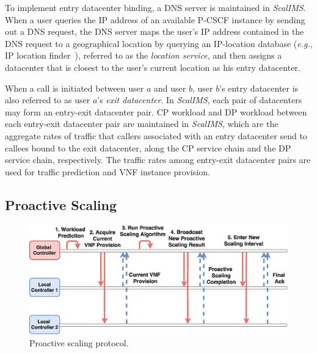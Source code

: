 To implement entry datacenter binding, a DNS server is maintained in \textit{ScalIMS}. When a user queries the IP address of an available P-CSCF instance by sending out a DNS request, the DNS server maps the user's IP address contained in the DNS request to a geographical location by querying an IP-location database ({\em e.g.}, IP location finder~\cite{iplocation}), referred to as the {\em location service}, and then assigns a datacenter that is closest to the user's current location as his entry datacenter.


When a call is initiated between user $a$ and user $b$, user $b$'s entry datacenter is also referred to as user $a$'s {\em exit datacenter}. In \textit{ScalIMS}, each pair of datacenters may form an entry-exit datacenter pair. CP workload and DP workload between each entry-exit datacenter pair are maintained in \textit{ScalIMS}, which are the aggregate rates of traffic that callers associated with an entry datacenter send to callees bound to the exit datacenter, along the CP service chain and the DP service chain, respectively. The traffic rates among entry-exit datacenter pairs are used for traffic prediction and VNF instance provision.

\subsection{Proactive Scaling}
\label{sec:CP_proactivescale}

\begin{figure}[h]
        \centering
        \includegraphics[width=1\columnwidth]{chap-scalims/figure/scaling-work-flow.eps}
        \caption{Proactive scaling protocol.}
        \label{fig:proactive-scaling}
\end{figure}

